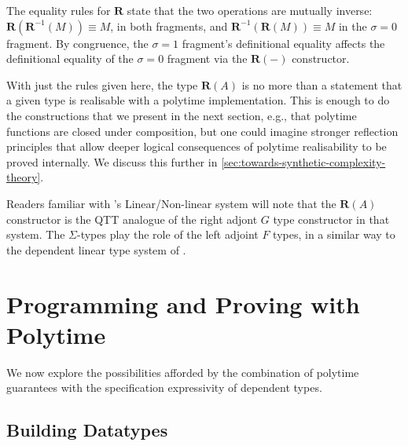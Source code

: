 \documentclass[acmsmall,screen]{acmart}
\newcommand{\Rtype}{\mathbf{R}}
\newcommand{\rIntro}{\mathbf{R}}
\newcommand{\rElim}{\mathbf{R}^{-1}}
\begin{document}
The equality rules for $\Rtype$ state that the two operations are
mutually inverse: $\rIntro(\rElim(M)) \equiv M$, in both fragments,
and $\rElim(\rIntro(M)) \equiv M$ in the $\sigma = 0$ fragment. By
congruence, the $\sigma = 1$ fragment's definitional equality affects
the definitional equality of the $\sigma = 0$ fragment via the
$\rIntro(-)$ constructor.

With just the rules given here, the type $\Rtype(A)$ is no more than a
statement that a given type is realisable with a polytime
implementation. This is enough to do the constructions that we present
in the next section, e.g., that polytime functions are closed under
composition, but one could imagine stronger reflection principles that
allow deeper logical consequences of polytime realisability to be
proved internally. We discuss this further in
\autoref{sec:towards-synthetic-complexity-theory}.

Readers familiar with \citet{Benton94}'s Linear/Non-linear system will
note that the $\Rtype(A)$ constructor is the QTT analogue of the right
adjont $G$ type constructor in that system. The $\Sigma$-types play
the role of the left adjoint $F$ types, in a similar way to the
dependent linear type system of \citet{KrishnaswamiPB15}.

\section{Programming and Proving with Polytime}
\label{sec:programming-polytime}

We now explore the possibilities afforded by the combination of
polytime guarantees with the specification expressivity of dependent
types.

\subsection{Building Datatypes}
\label{sec:prog-datatypes}
\end{document}
